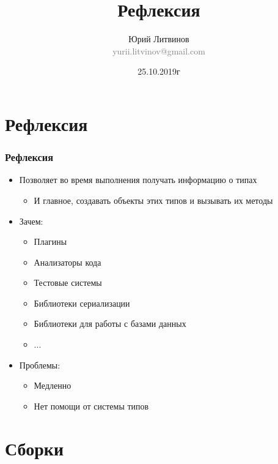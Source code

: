 \documentclass[xetex,mathserif,serif]{beamer}
\title{Рефлексия}
\author[Юрий Литвинов]{Юрий Литвинов\\\small{\textcolor{gray}{yurii.litvinov@gmail.com}}}
\date{25.10.2019г}
\begin{document}
	\frame{\titlepage}

	\section{Рефлексия}

	\begin{frame}
		\frametitle{Рефлексия}
		\begin{itemize}
			\item Позволяет во время выполнения получать информацию о типах
			\begin{itemize}
				\item И главное, создавать объекты этих типов и вызывать их методы
			\end{itemize}
			\item Зачем:
			\begin{itemize}
				\item Плагины
				\item Анализаторы кода
				\item Тестовые системы
				\item Библиотеки сериализации
				\item Библиотеки для работы с базами данных
				\item ...
			\end{itemize}
			\item Проблемы:
			\begin{itemize}
				\item Медленно
				\item Нет помощи от системы типов
			\end{itemize}
		\end{itemize}
	\end{frame}

	\section{Сборки}
\end{document}
